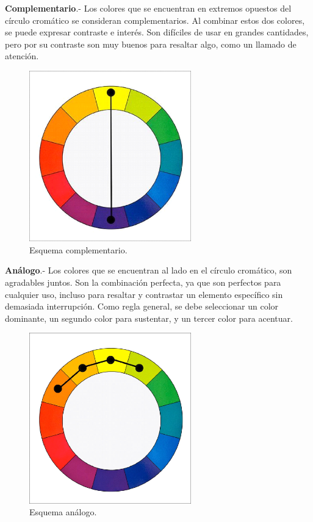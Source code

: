 \textbf{Complementario}.- Los colores que se encuentran en extremos opuestos del círculo cromático se consideran complementarios. Al combinar estos dos colores, se puede expresar contraste e interés. Son difíciles de usar en grandes cantidades, pero por su contraste son muy buenos para resaltar algo, como un llamado de atención.
\begin{figure}[h!]
	\centering
	\includegraphics[width=7cm]{imagenes/marcoteorico/disenointeriores/complementario.png}
	\caption{Esquema complementario.\cite{B13}}
	\label{fig:complementario}
\end{figure}

\textbf{Análogo}.- Los colores que se encuentran al lado en el círculo cromático, son agradables juntos. Son la combinación perfecta, ya que son perfectos para cualquier uso, incluso para resaltar y contrastar un elemento específico sin demasiada interrupción. Como regla general, se debe seleccionar un color dominante, un segundo color para sustentar, y un tercer color para acentuar.
\begin{figure}[h!]
	\centering
	\includegraphics[width=7cm]{imagenes/marcoteorico/disenointeriores/analogo.png}
	\caption{Esquema análogo.\cite{B13}}
	\label{fig:analogo}
\end{figure}


\par 
